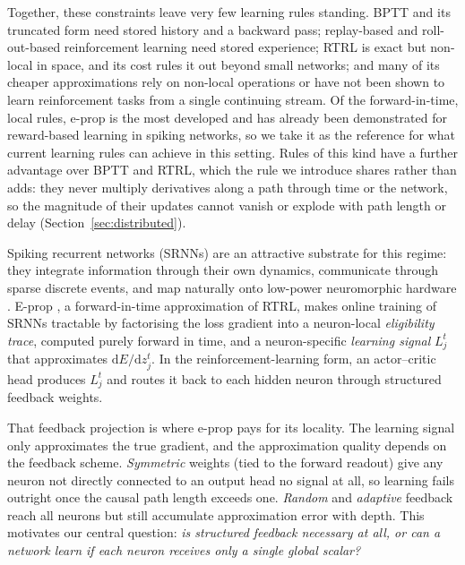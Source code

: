 \documentclass[10pt,twocolumn]{article}
\begin{document}
Together, these constraints leave very few learning rules standing. BPTT and
its truncated form need stored history and a backward pass; replay-based and
roll-out-based reinforcement learning need stored experience; RTRL is exact
but non-local in space, and its cost rules it out beyond small networks; and many of its cheaper
approximations rely on non-local operations or have not been shown to learn
reinforcement tasks from a single continuing stream. Of the forward-in-time,
local rules, e-prop is the most developed and has already been demonstrated
for reward-based learning in spiking networks, so we take it as the reference
for what current learning rules can achieve in this setting. Rules of this kind
have a further advantage over BPTT and RTRL, which the rule we introduce shares
rather than adds: they never multiply derivatives along a path through time or
the network, so the magnitude of their updates cannot vanish or explode with
path length or delay (Section~\ref{sec:distributed}).

Spiking recurrent networks (SRNNs) are an attractive substrate for this
regime: they integrate information through their own dynamics, communicate
through sparse discrete events, and map naturally onto low-power neuromorphic
hardware \citep{Davies2018Loihi,Painkras2013SpiNNaker}. E-prop
\citep{eprop2020}, a forward-in-time approximation of RTRL, makes online
training of SRNNs tractable by factorising the loss gradient into a
neuron-local \emph{eligibility trace}, computed purely forward in time, and a
neuron-specific \emph{learning signal} $L^t_j$ that approximates
$\mathrm{d}E/\mathrm{d}z^t_j$. In the reinforcement-learning form, an
actor--critic head produces $L^t_j$ and routes it back to each hidden neuron
through structured feedback weights.

That feedback projection is where e-prop pays for its locality. The learning
signal only approximates the true gradient, and the approximation quality
depends on the feedback scheme. \emph{Symmetric} weights (tied to the forward
readout) give any neuron not directly connected to an output head no signal at
all, so learning fails outright once the causal path length exceeds one.
\emph{Random} and \emph{adaptive} feedback reach all neurons but still
accumulate approximation error with depth. This motivates our central
question: \emph{is structured feedback necessary at all, or can a network
learn if each neuron receives only a single global scalar?}
\end{document}
